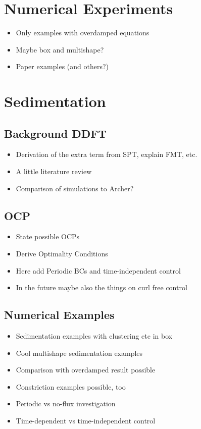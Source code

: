 \documentclass[11pt, a4paper]{article}
\theoremstyle{definition}
\begin{document}
	\section{Numerical Experiments}
		\begin{itemize}
			\item Only examples with overdamped equations
			\item Maybe box and multishape?
			\item Paper examples (and others?)
		\end{itemize}

    \section{Sedimentation}
	\subsection{Background DDFT}
		\begin{itemize}
			\item Derivation of the extra term from SPT, explain FMT, etc. 
			\item A little literature review
			\item Comparison of simulations to Archer?
		\end{itemize}
	\subsection{OCP}
		\begin{itemize}
			\item State possible OCPs
			\item Derive Optimality Conditions
			\item Here add Periodic BCs and time-independent control
			\item In the future maybe also the things on curl free control
		\end{itemize}
	\subsection{Numerical Examples}
		\begin{itemize}
			\item Sedimentation examples with clustering etc in box
			\item Cool multishape sedimentation examples
			\item Comparison with overdamped result possible
			\item Constriction examples possible, too
			\item Periodic vs no-flux investigation
			\item Time-dependent vs time-independent control 
		\end{itemize}
\end{document}
